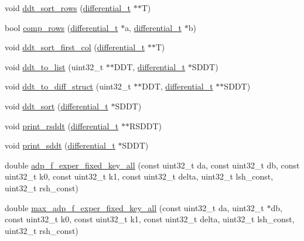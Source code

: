 \begin{DoxyCompactItemize}
\item 
void \hyperlink{adp-tea-f-fk-ddt_8hh_ae2648d869a0e829edcd50795485f601a}{ddt\-\_\-sort\-\_\-rows} (\hyperlink{structdifferential__t}{differential\-\_\-t} $\ast$$\ast$\-T)
\item 
bool \hyperlink{adp-tea-f-fk-ddt_8hh_a8170accc84159941657fd6f5d26cf934}{comp\-\_\-rows} (\hyperlink{structdifferential__t}{differential\-\_\-t} $\ast$a, \hyperlink{structdifferential__t}{differential\-\_\-t} $\ast$b)
\item 
void \hyperlink{adp-tea-f-fk-ddt_8hh_a3670224453681d2f7ba2c30ac943e0df}{ddt\-\_\-sort\-\_\-first\-\_\-col} (\hyperlink{structdifferential__t}{differential\-\_\-t} $\ast$$\ast$\-T)
\item 
void \hyperlink{adp-tea-f-fk-ddt_8hh_a8df073a51fe2d186f4b906a32aa12358}{ddt\-\_\-to\-\_\-list} (uint32\-\_\-t $\ast$$\ast$\-D\-D\-T, \hyperlink{structdifferential__t}{differential\-\_\-t} $\ast$\-S\-D\-D\-T)
\item 
void \hyperlink{adp-tea-f-fk-ddt_8hh_aed88c10880d1cccbd59fb73cda9b73a5}{ddt\-\_\-to\-\_\-diff\-\_\-struct} (uint32\-\_\-t $\ast$$\ast$\-D\-D\-T, \hyperlink{structdifferential__t}{differential\-\_\-t} $\ast$$\ast$\-S\-D\-D\-T)
\item 
void \hyperlink{adp-tea-f-fk-ddt_8hh_abdac451896b7ea3af93445baddf6dfe2}{ddt\-\_\-sort} (\hyperlink{structdifferential__t}{differential\-\_\-t} $\ast$\-S\-D\-D\-T)
\item 
void \hyperlink{adp-tea-f-fk-ddt_8hh_a322003a873ab463e906e45cb30cd9f78}{print\-\_\-rsddt} (\hyperlink{structdifferential__t}{differential\-\_\-t} $\ast$$\ast$\-R\-S\-D\-D\-T)
\item 
void \hyperlink{adp-tea-f-fk-ddt_8hh_a0fa6898489cbc273789ac98e7a9abefb}{print\-\_\-sddt} (\hyperlink{structdifferential__t}{differential\-\_\-t} $\ast$\-S\-D\-D\-T)
\item 
double \hyperlink{adp-tea-f-fk-ddt_8hh_a705378e71f93b36fff9a8b543f6b963d}{adp\-\_\-f\-\_\-exper\-\_\-fixed\-\_\-key\-\_\-all} (const uint32\-\_\-t da, const uint32\-\_\-t db, const uint32\-\_\-t k0, const uint32\-\_\-t k1, const uint32\-\_\-t delta, uint32\-\_\-t lsh\-\_\-const, uint32\-\_\-t rsh\-\_\-const)
\item 
double \hyperlink{adp-tea-f-fk-ddt_8hh_a900cf5610b1e2d1bde8d81f865217a33}{max\-\_\-adp\-\_\-f\-\_\-exper\-\_\-fixed\-\_\-key\-\_\-all} (const uint32\-\_\-t da, uint32\-\_\-t $\ast$db, const uint32\-\_\-t k0, const uint32\-\_\-t k1, const uint32\-\_\-t delta, uint32\-\_\-t lsh\-\_\-const, uint32\-\_\-t rsh\-\_\-const)

\end{DoxyCompactItemize}
